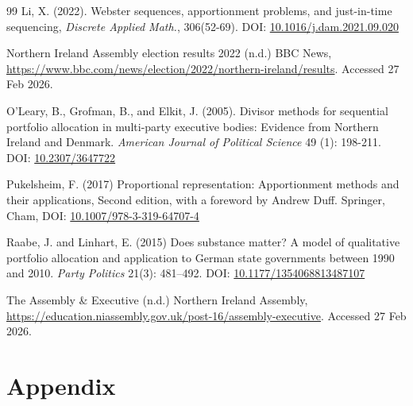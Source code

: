 \documentclass[pdflatex,sn-mathphys-num]{sn-jnl}
\theoremstyle{thmstyleone}%
\theoremstyle{thmstyletwo}%
\theoremstyle{thmstylethree}%
\begin{document}
\begin{thebibliography}{99}
  Li, X. (2022). Webster sequences, apportionment problems, and just-in-time sequencing, {\it Discrete Applied Math.}, 306(52-69). DOI: \href{https://doi.org/10.1016/j.dam.2021.09.020}{10.1016/j.dam.2021.09.020}

 Northern Ireland Assembly election results 2022 (n.d.) BBC News, \href{https://www.bbc.com/news/election/2022/northern-ireland/results}{https://www.bbc.com/news/election/2022/northern-ireland/results}. Accessed 27 Feb 2026.

 O'Leary, B., Grofman, B., and Elkit, J. (2005). Divisor methods for sequential portfolio allocation in multi-party executive bodies: Evidence from Northern Ireland and Denmark. {\it American Journal of Political Science} 49 (1): 198-211. DOI: \href{https://doi.org/10.2307/3647722}{10.2307/3647722}

 Pukelsheim, F. (2017) Proportional representation: Apportionment methods and their applications, Second edition, with a foreword by Andrew Duff. Springer, Cham, DOI: \href{https://doi.org/10.1007/978-3-319-64707-4}{10.1007/978-3-319-64707-4}

 Raabe, J. and Linhart, E. (2015) Does substance matter? A model of qualitative portfolio allocation and application to German state governments between 1990 and 2010. {\it Party Politics} 21(3): 481--492.  DOI: \href{https://doi.org/10.1177/1354068813487107}{10.1177/1354068813487107}

 The Assembly \& Executive (n.d.) Northern Ireland Assembly, \href{https://education.niassembly.gov.uk/post-16/assembly-executive}{https://education.niassembly.gov.uk/post-16/assembly-executive}. Accessed 27 Feb 2026.

\end{thebibliography} 
 
 \section*{Appendix}
 
\end{document}
